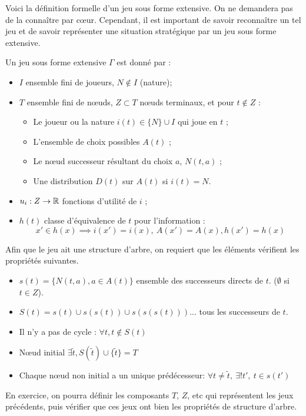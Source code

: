 Voici la définition formelle d'un jeu sous forme extensive. On ne
demandera pas de la connaître par c{\oe}ur. Cependant, il est
important de savoir reconnaître un tel jeu et de savoir
représenter une situation stratégique par un jeu sous forme
extensive.
\begin{definition}
Un jeu sous forme extensive $\Gamma$ est donné par :

\begin{itemize}
\item $I$ ensemble fini de joueurs,  $N\not\in I$ (nature);
\item $T$ ensemble fini de n{\oe}uds, $Z\subset T$ n{\oe}uds terminaux, et pour
$t\not\in Z$ :
\begin{itemize}
\item Le joueur ou la nature $i(t)\in \{N\}\cup I$ qui joue en $t$ ;
\item L'ensemble de choix possibles $A(t)$ ;
\item Le n{\oe}ud successeur résultant du choix $a$, $N(t,a)$ ;
\item Une distribution $D(t)$ sur $A(t)$ si $i(t)= N$.
\end{itemize}
\item $u_i:Z\to\mathbb R$ fonctions d'utilité de $i$ ;
\item $h(t)$ classe d'équivalence de $t$ pour l'information :
$$
x'\in h(x) \implies i(x')= i(x),~A(x')=A(x), h(x')=h(x)
$$
\end{itemize}

Afin que le jeu ait une structure d'arbre, on requiert que les
éléments vérifient les propriétés suivantes.

\begin{itemize}
\item $s(t)=\{N(t,a),a\in A(t)\}$ ensemble des successeurs directs de $t$. ($\emptyset$ si $t\in Z$).
\item $S(t)= s(t)\cup s(s(t)) \cup s(s(s(t)))...$ tous les successeurs de $t$.
\end{itemize}
\begin{itemize}
\item Il n'y a pas de cycle : $\forall t, t\not\in S(t)$
\item N{\oe}ud initial $\exists\tilde t, S(\tilde t)\cup\{\tilde t\}=T$
\item Chaque n{\oe}ud non initial a un unique prédécesseur:
$\forall t\neq \tilde t,~\exists ! t',~t\in s(t')$
\end{itemize}
\end{definition}
En exercice, on pourra définir les composants $T$, $Z$, etc qui
représentent les jeux précédents, puis vérifier que ces jeux ont
bien les propriétés de structure d'arbre.

